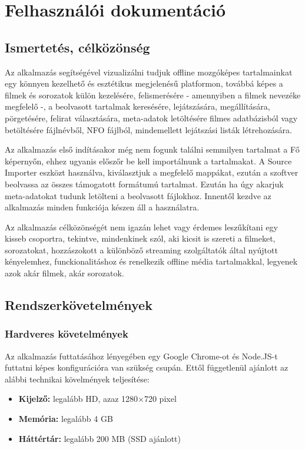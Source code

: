 \chapter{Felhasználói dokumentáció} %
\label{ch:user}

\section{Ismertetés, célközönség}
Az alkalmazás segítségével vizualizálni tudjuk offline mozgóképes tartalmainkat egy könnyen kezelhető és esztétikus megjelenésű platformon, továbbá képes a filmek és sorozatok külön kezelésére, felismerésére - amennyiben a filmek nevezéke megfelelő -, a beolvasott tartalmak keresésére, lejátszására, megállítására, pörgetésére, felirat választására, meta-adatok letöltésére filmes adatbázisból vagy betöltésére fájlnévből, NFO fájlból, mindemellett lejátszási listák létrehozására.

Az alkalmazás első indításakor még nem fogunk találni semmilyen tartalmat a Fő képernyőn, ehhez ugyanis előszőr be kell importálnunk a tartalmakat. A Source Importer eszközt használva, kiválasztjuk a megfelelő mappákat, ezután a szoftver beolvassa az összes támogatott formátumú tartalmat. Ezután ha úgy akarjuk meta-adatokat tudunk letölteni a beolvasott fájlokhoz. Innentől kezdve az alkalmazás minden funkciója készen áll a használatra.

Az alkalmazás célközönségét nem igazán lehet vagy érdemes leszűkítani egy kisseb csoportra, tekintve, mindenkinek szól, aki kicsit is szereti a filmeket, sorozatokat, hozzászokott a különböző streaming szolgáltatók által nyújtott kényelemhez, funckionalitáshoz és renelkezik offline média tartalmakkal, legyenek azok akár filmek, akár sorozatok.

\cleardoublepage
\section{Rendszerkövetelmények}
\subsection{Hardveres követelmények}
Az alkalmazás futtatásához lényegében egy Google Chrome-ot és Node.JS-t futtatni képes konfigurációra van szükség csupán. Ettől függetlenül ajánlott az alábbi technikai kövelmények teljesítése:
\begin{itemize}
    \item {\textbf {Kijelző: }} legalább HD, azaz 1280×720 pixel
	\item {\textbf {Memória: }} legalább 4 GB
	\item {\textbf {Háttértár: }} legalább 200 MB (SSD ajánlott)
\end{itemize}

